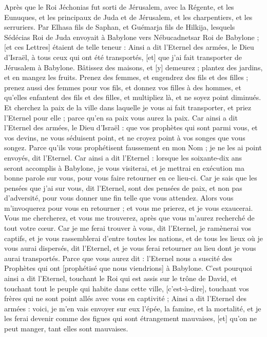 \begin{multicols}{2}
Après que le Roi Jéchonias fut sorti de Jérusalem, avec la Régente, et les Eunuques, et les principaux de Juda et de Jérusalem, et les charpentiers, et les serruriers.
Par Elhasa fils de Saphan, et Guémarja fils de Hilkija, lesquels Sédécias Roi de Juda envoyait à Babylone vers Nébucadnetsar Roi de Babylone ; [et ces Lettres] étaient de telle teneur :
Ainsi a dit l'Eternel des armées, le Dieu d'Israël, à tous ceux qui ont été transportés, [et] que j'ai fait transporter de Jérusalem à Babylone.
Bâtissez des maisons, et [y] demeurez ; plantez des jardins, et en mangez les fruits.
Prenez des femmes, et engendrez des fils et des filles ; prenez aussi des femmes pour vos fils, et donnez vos filles à des hommes, et qu'elles enfantent des fils et des filles, et multipliez là, et ne soyez point diminués.
Et cherchez la paix de la ville dans laquelle je vous ai fait transporter, et priez l'Eternel pour elle ; parce qu'en sa paix vous aurez la paix.
Car ainsi a dit l'Eternel des armées, le Dieu d'Israël : que vos prophètes qui sont parmi vous, et vos devins, ne vous séduisent point, et ne croyez point à vos songes que vous songez.
Parce qu'ils vous prophétisent faussement en mon Nom ; je ne les ai point envoyés, dit l'Eternel.
Car ainsi a dit l'Eternel : lorsque les soixante-dix ans seront accomplis à Babylone, je vous visiterai, et je mettrai en exécution ma bonne parole sur vous, pour vous faire retourner en ce lieu-ci.
Car je sais que les pensées que j'ai sur vous, dit l'Eternel, sont des pensées de paix, et non pas d'adversité, pour vous donner une fin telle que vous attendez.
Alors vous m'invoquerez pour vous en retourner ; et vous me prierez, et je vous exaucerai.
Vous me chercherez, et vous me trouverez, après que vous m'aurez recherché de tout votre cœur.
Car je me ferai trouver à vous, dit l'Eternel, je ramènerai vos captifs, et je vous rassemblerai d'entre toutes les nations, et de tous les lieux où je vous aurai dispersés, dit l'Eternel, et je vous ferai retourner au lieu dont je vous aurai transportés.
Parce que vous aurez dit : l'Eternel nous a suscité des Prophètes qui ont [prophétisé que nous viendrions] à Babylone.
C'est pourquoi ainsi a dit l'Eternel, touchant le Roi qui est assis sur le trône de David, et touchant tout le peuple qui habite dans cette ville, [c'est-à-dire], touchant vos frères qui ne sont point allés avec vous en captivité ;
Ainsi a dit l'Eternel des armées : voici, je m'en vais envoyer sur eux l'épée, la famine, et la mortalité, et je les ferai devenir comme des figues qui sont étrangement mauvaises, [et] qu'on ne peut manger, tant elles sont mauvaises.

\end{multicols}
